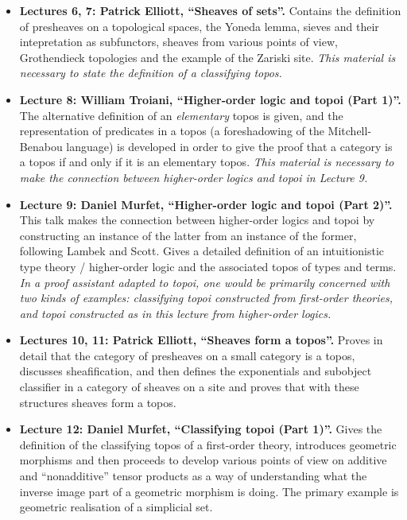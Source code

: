 \documentclass[english,letter paper,12pt,reqno]{article}
\theoremstyle{example}
\begin{document}
\begin{itemize}
\item \textbf{Lectures 6, 7: Patrick Elliott, ``Sheaves of sets''.} Contains the definition of presheaves on a topological spaces, the Yoneda lemma, sieves and their intepretation as subfunctors, sheaves from various points of view, Grothendieck topologies and the example of the Zariski site. \emph{This material is necessary to state the definition of a classifying topos.}

\item \textbf{Lecture 8: William Troiani, ``Higher-order logic and topoi (Part 1)''.} The alternative definition of an \emph{elementary} topos is given, and the representation of predicates in a topos (a foreshadowing of the Mitchell-Benabou language) is developed in order to give the proof that a category is a topos if and only if it is an elementary topos. \emph{This material is necessary to make the connection between higher-order logics and topoi in Lecture 9.}

\item \textbf{Lecture 9: Daniel Murfet, ``Higher-order logic and topoi (Part 2)''.} This talk makes the connection between higher-order logics and topoi by constructing an instance of the latter from an instance of the former, following Lambek and Scott. Gives a detailed definition of an intuitionistic type theory / higher-order logic and the associated topos of types and terms. \emph{In a proof assistant adapted to topoi, one would be primarily concerned with two kinds of examples: classifying topoi constructed from first-order theories, and topoi constructed as in this lecture from higher-order logics.}

\item \textbf{Lectures 10, 11: Patrick Elliott, ``Sheaves form a topos''.} Proves in detail that the category of presheaves on a small category is a topos, discusses sheafification, and then defines the exponentials and subobject classifier in a category of sheaves on a site and proves that with these structures sheaves form a topos.

\item \textbf{Lecture 12: Daniel Murfet, ``Classifying topoi (Part 1)''.} Gives the definition of the classifying topos of a first-order theory, introduces geometric morphisms and then proceeds to develop various points of view on additive and ``nonadditive'' tensor products as a way of understanding what the inverse image part of a geometric morphism is doing. The primary example is geometric realisation of a simplicial set.


\end{itemize}
\end{document}
